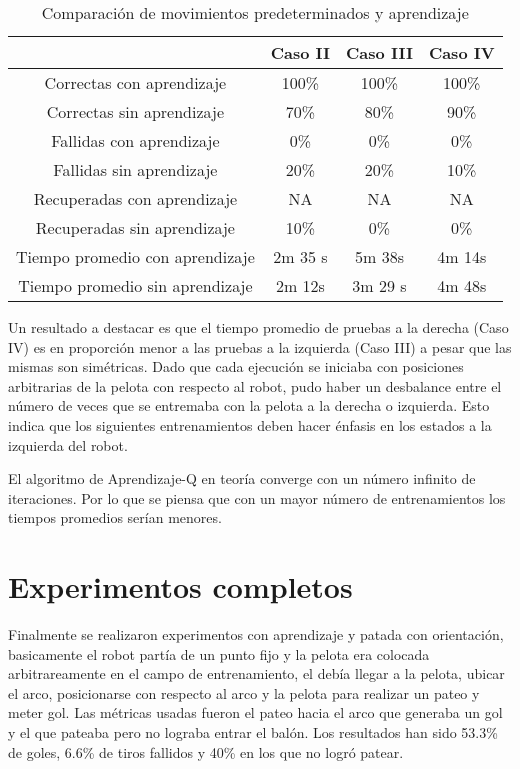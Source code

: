 \begin{table}
\centering
\begin{tabular}{c c c c}
\hline 
 & Caso II & Caso III & Caso IV \\ 
\hline 
Correctas con aprendizaje & 100\% & 100\% & 100\% \\ 
Correctas sin aprendizaje & 70\% & 80\% & 90\% \\ 
Fallidas con aprendizaje & 0\% & 0\% & 0\% \\ 
Fallidas sin aprendizaje & 20\% & 20\% & 10\% \\ 
Recuperadas con aprendizaje & NA & NA & NA \\ 
Recuperadas sin aprendizaje & 10\% & 0\% & 0\% \\ 
Tiempo promedio con aprendizaje & 2m 35 s & 5m 38s & 4m 14s \\ 
Tiempo promedio sin aprendizaje & 2m 12s & 3m 29 s & 4m 48s \\
\hline
\end{tabular} 
\caption{Comparaci\'on de movimientos predeterminados y aprendizaje}
\label{tabla:comparacion}

\end{table}

 Un resultado a destacar es que el tiempo promedio de pruebas a la derecha (Caso IV) es en proporci\'on  menor a las pruebas a la izquierda (Caso III) a pesar que las mismas son sim\'etricas. Dado que cada ejecución se iniciaba con posiciones arbitrarias de la pelota con respecto al robot, pudo haber un desbalance entre el número de veces que se entremaba con la pelota a la derecha o izquierda. Esto indica que los siguientes entrenamientos deben hacer \'enfasis en los estados a la izquierda del robot.

El algoritmo de Aprendizaje-Q en teoría converge con un número infinito de iteraciones. Por lo que se piensa que con un mayor número de entrenamientos los tiempos promedios serían menores. 
 
\section{Experimentos completos} \label{completos}

Finalmente se realizaron experimentos con aprendizaje y patada con orientaci\'on, basicamente el robot part\'ia de un punto fijo y la pelota era colocada arbitrareamente en el campo de entrenamiento, el deb\'ia llegar a la pelota, ubicar el arco, posicionarse con respecto al arco y la pelota para realizar un pateo y meter gol.
Las m\'etricas usadas fueron el pateo hacia el arco que generaba un gol y el que pateaba pero no lograba entrar el bal\'on. Los resultados han sido 53.3\% de goles, 6.6\% de tiros fallidos y  40\% en los que no logró patear. 


